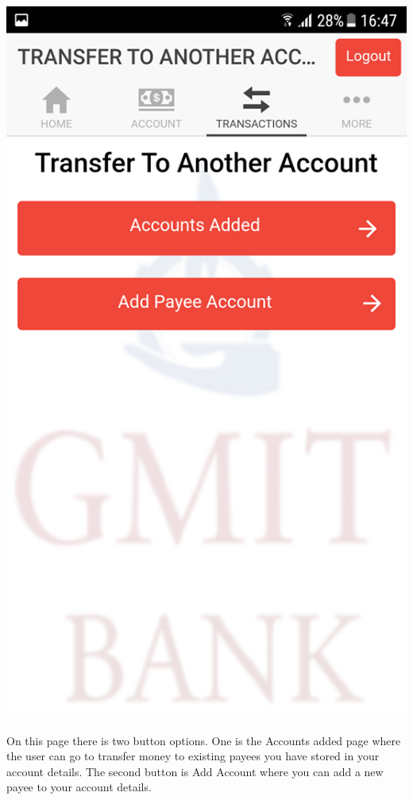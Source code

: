 \begin{center}    
    \includegraphics[scale=0.5]{img/10transferspage.png}
\end{center}
On this page there is two button options. One is the Accounts added page where the user can go to transfer money to existing payees you have stored in your account details. The second button is Add Account where you can add a new payee to your account details.
\paragraph{}

